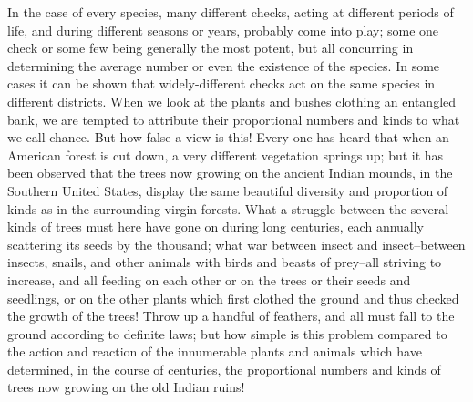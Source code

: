 In the case of every species, many different checks, acting at different periods of life, and during different seasons or years, probably come into play; some one check or some few being generally the most potent, but all concurring in determining the average number or even the existence of the species. In some cases it can be shown that widely-different checks act on the same species in different districts. When we look at the plants and bushes clothing an entangled bank, we are tempted to attribute their proportional numbers and kinds to what we call chance. But how false a view is this! Every one has heard that when an American forest is cut down, a very different vegetation springs up; but it has been observed that the trees now growing on the ancient Indian mounds, in the Southern United States, display the same beautiful diversity and proportion of kinds as in the surrounding virgin forests. What a struggle between the several kinds of trees must here have gone on during long centuries, each annually scattering its seeds by the thousand; what war between insect and insect--between insects, snails, and other animals with birds and beasts of prey--all striving to increase, and all feeding on each other or on the trees or their seeds and seedlings, or on the other plants which first clothed the ground and thus checked the growth of the trees! Throw up a handful of feathers, and all must fall to the ground according to definite laws; but how simple is this problem compared to the action and reaction of the innumerable plants and animals which have determined, in the course of centuries, the proportional numbers and kinds of trees now growing on the old Indian ruins!

